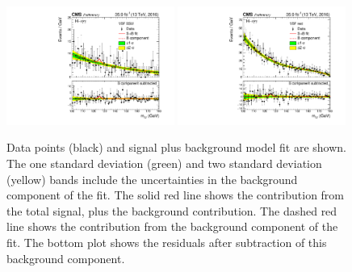 \begin{figure}[hptb]
  \centering
  \includegraphics[width=0.49\textwidth]{Figures/Appendices/_forAppendix2016ch1_RECO_VBFTOPO_BSM_13TeV.pdf}
  \includegraphics[width=0.49\textwidth]{Figures/Appendices/_forAppendix2016ch1_RECO_VBFTOPO_REST_13TeV.pdf}
  \caption[Signal plus background fits to data.]
  {
    Data points (black) and signal plus background model fit are shown. 
    The one standard deviation (green) and two standard deviation (yellow) bands 
    include the uncertainties in the background component of the fit. 
    The solid red line shows the contribution from the total signal, plus the background contribution. 
    The dashed red line shows the contribution from the background component of the fit. 
    The bottom plot shows the residuals after subtraction of this background component.
  }
\end{figure}

